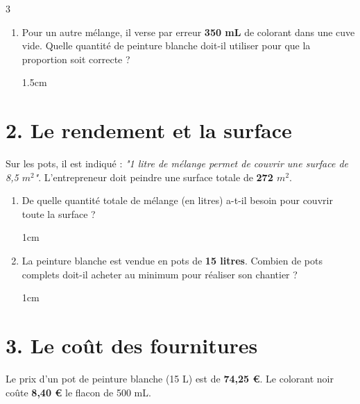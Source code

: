 \documentclass[a4paper]{book}
\begin{document}
{\begin{exerciceNote}{3}
\begin{enumerate}[leftmargin=*]
                        
            \begin{ZoneReponse}{1.5cm}                
            \end{ZoneReponse}
            
            \item Pour un autre mélange, il verse par erreur \textbf{350 mL} de colorant dans une cuve vide. Quelle quantité de peinture blanche doit-il utiliser pour que la proportion soit correcte ?

                        
            \begin{ZoneReponse}{1.5cm}                
            \end{ZoneReponse}
        \end{enumerate}
        
        \section*{2. Le rendement et la surface}
        Sur les pots, il est indiqué : \textit{"1 litre de mélange permet de couvrir une surface de 8,5 $m^2$"}. L'entrepreneur doit peindre une surface totale de \textbf{272 $m^2$}.
        
        \begin{enumerate}[resume, leftmargin=*]
            \item De quelle quantité totale de mélange (en litres) a-t-il besoin pour couvrir toute la surface ?
            
            \begin{ZoneReponse}{1cm}                
            \end{ZoneReponse}
            
            \item La peinture blanche est vendue en pots de \textbf{15 litres}. Combien de pots complets doit-il acheter au minimum pour réaliser son chantier ?

            \begin{ZoneReponse}{1cm}                
            \end{ZoneReponse}
        \end{enumerate}
        
        \section*{3. Le coût des fournitures}
        Le prix d'un pot de peinture blanche (15 L) est de \textbf{74,25 \euro}. Le colorant noir coûte \textbf{8,40 \euro} le flacon de 500 mL.
        

\end{exerciceNote}}
\end{document}
